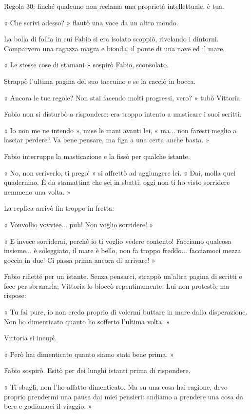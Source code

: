 Regola 30: finché qualcuno non reclama una proprietà intellettuale, è tua.

« Che scrivi adesso? » flautò una voce da un altro mondo.

La bolla di follia in cui Fabio si era isolato scoppiò, rivelando i dintorni. Comparvero una ragazza magra e bionda, il ponte di una nave ed il mare.

« Le stesse cose di stamani » sospirò Fabio, sconsolato.

Strappò l'ultima pagina del suo taccuino e se la cacciò in bocca.

« Ancora le tue regole? Non stai facendo molti progressi, vero? » tubò Vittoria.

Fabio non si disturbò a rispondere: era troppo intento a masticare i suoi scritti.

« Io non me ne intendo », mise le mani avanti lei, « ma... non faresti meglio a lasciar perdere? Va bene pensare, ma figa a una certa anche basta. »

Fabio interruppe la masticazione e la fissò per qualche istante.

« No, non scriverlo, ti prego! » si affrettò ad aggiungere lei. « Dai, molla quel quadernino. È da stamattina che sei in sbatti, oggi non ti ho visto sorridere nemmeno una volta. »

La replica arrivò fin troppo in fretta:

« Vonvollio vovviee... puh! Non voglio sorridere! »

« E invece sorriderai, perché io ti voglio vedere contento! Facciamo qualcosa insieme... è soleggiato, il mare è bello, non fa troppo freddo... facciamoci mezza goccia in due! Ci passa prima ancora di arrivare! »

Fabio rifletté per un istante. Senza pensarci, strappò un'altra pagina di scritti e fece per sbranarla; Vittoria lo bloccò repentinamente. Lui non protestò, ma rispose:

« Tu fai pure, io non credo proprio di volermi buttare in mare dalla disperazione. Non ho dimenticato quanto ho sofferto l'ultima volta. »

Vittoria si incupì.

« Però hai dimenticato quanto siamo stati bene prima. »

Fabio sospirò. Esitò per dei lunghi istanti prima di rispondere.

« Ti sbagli, non l'ho affatto dimenticato. Ma su una cosa hai ragione, devo proprio prendermi una pausa dai miei pensieri: andiamo a prendere una cosa da bere e godiamoci il viaggio. »

